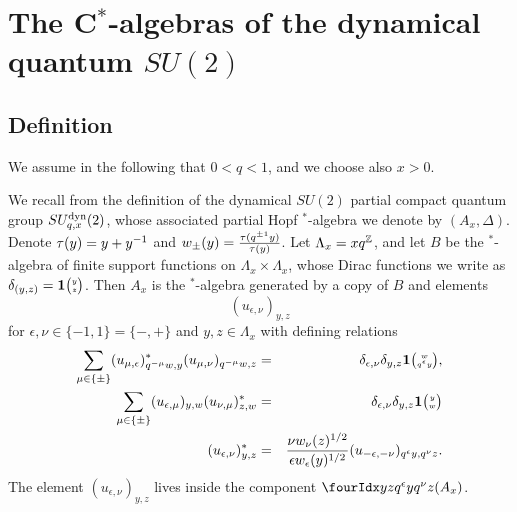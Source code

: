 


\section{The C$^*$-algebras of the dynamical quantum $SU(2)$}\label{SecUni}

\subsection{Definition}\label{SecDefSUqdyn}

We assume in the following that $0<q<1$, and we choose also $x>0$.

We recall from \cite[Section 5]{DCT1} the definition of the dynamical $SU(2)$ partial compact quantum group $SU_{q,x}^{\operatorname{\mathrm{dyn}}}(2)$, whose associated partial Hopf $^*$-algebra we denote by $(A_x,\Delta)$. Denote $\operatorname{\tau}(y) = y+y^{-1}$ and $w_{\pm}(y) = \frac{\operatorname{\tau}(q^{\pm 1}y)}{\operatorname{\tau}(y)}$. Let $\Lambda_x = xq^{\mathbb{Z}}$, and let $B$ be the $^*$-algebra of finite support functions on $\Lambda_x\times \Lambda_x$, whose Dirac functions we write as $\delta_{(y,z)}=\mathbf{1}{\tiny {\begin{pmatrix} y\\z\end{pmatrix}}}$. Then $A_x$ is the $^*$-algebra generated by a copy of $B$ and elements \[(u_{\epsilon,\nu})_{y,z}\] for $\epsilon,\nu\in \{-1,1\}=\{-,+\}$ and $y,z\in \Lambda_x$ with defining relations \begin{eqnarray*} \sum_{\mu\in \{\pm\}} (u_{\mu,\epsilon})_{q^{-\mu}w,y}^* (u_{\mu,\nu})_{q^{-\mu}w,z}&=& \delta_{\epsilon,\nu} \delta_{y,z} \mathbf{1}{\tiny {\begin{pmatrix} w\\q^{\epsilon}y\end{pmatrix}}},\\ \sum_{\mu\in \{\pm\}} (u_{\epsilon,\mu})_{y,w} (u_{\nu,\mu})_{z,w}^* &=& \delta_{\epsilon,\nu}\delta_{y,z} \mathbf{1}{\tiny {\begin{pmatrix} y\\w\end{pmatrix}}} \\ (u_{\epsilon,\nu})_{y,z}^* &=& \frac{\nu w_{\nu}(z)^{1/2}}{\epsilon w_{\epsilon}(y)^{1/2}} (u_{-\epsilon,-\nu})_{q^{\epsilon}y,q^{\nu}z}.\end{eqnarray*} The element $(u_{\epsilon,\nu})_{y,z}$ lives inside the component $\Gr{(A_x)}{y}{q^{\epsilon}y}{z}{q^{\nu}z}$.

